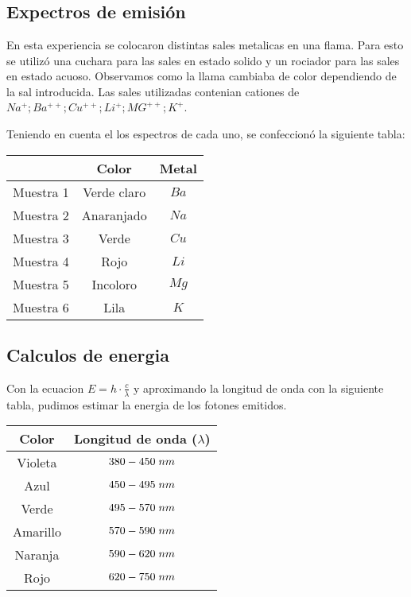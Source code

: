 \documentclass[12pt]{report}
\begin{document}
\chapter{}
\section{Expectros de emisión}
En esta experiencia se colocaron distintas sales metalicas en una flama.
Para esto se utilizó una cuchara para las sales en estado solido y un rociador para las sales en 
estado acuoso.
Observamos como la llama cambiaba de color dependiendo de la sal introducida.
Las sales utilizadas contenian cationes de $Na^{+} ; Ba^{++} ; Cu^{++} ; Li^{+} ; MG^{++} ; K^{+}$.

Teniendo en cuenta el los espectros de cada uno, se confeccionó la siguiente tabla:

\begin{table}[h!]
\centering
\begin{tabular}{|c|c|c|}
  \hline
  \textbf{} & \textbf{Color} & \textbf{Metal} \\
  \hline
  Muestra 1 & Verde claro & $Ba$ \\
  \hline
  Muestra 2 & Anaranjado & $Na$\\
  \hline
  Muestra 3 & Verde & $Cu$ \\
  \hline
  Muestra 4 & Rojo & $Li$\\
  \hline
  Muestra 5 & Incoloro & $Mg$\\
  \hline
  Muestra 6 & Lila & $K$ \\
  \hline
\end{tabular}
\label{tab:colores_metales}
\end{table}

\section{Calculos de energia}
Con la ecuacion $E=h\cdot\frac{c}{\lambda}$ y aproximando la longitud de onda con la siguiente
tabla, pudimos estimar la energia de los fotones emitidos.

\begin{table}[h!]
  \centering
  \begin{tabular}{|c|c|}
    \hline
    Color & Longitud de onda ($\lambda$)\\
    \hline
    Violeta & $380-450\hspace{1mm}nm$ \\
    \hline
    Azul & $450-495\hspace{1mm} nm$ \\
    \hline
    Verde & $495-570\hspace{1mm} nm$ \\
    \hline
    Amarillo & $570-590\hspace{1mm} nm$ \\
    \hline
    Naranja & $590-620\hspace{1mm} nm$ \\
    \hline
    Rojo & $620-750\hspace{1mm} nm$ \\
    \hline
  \end{tabular}
\end{table}
\end{document}
